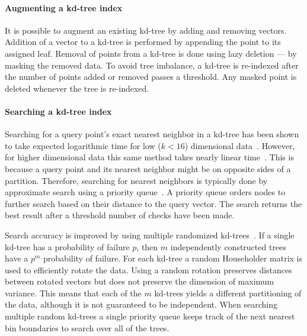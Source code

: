             \paragraph{Augmenting a kd-tree index}
            It is possible to augment an existing kd-tree by adding and removing vectors. Addition of a vector to a
            kd-tree is performed by appending the point to its assigned leaf. Removal of points from a kd-tree is
            done using lazy deletion --- \ie{} by masking the removed data. To avoid tree imbalance, a kd-tree is
            re-indexed after the number of points added or removed passes a threshold. Any masked point is deleted
            whenever the tree is re-indexed.

            \paragraph{Searching a kd-tree index}
            Searching for a query point's exact nearest neighbor in a kd-tree has been shown to take expected
            logarithmic time for low ($k < 16$) dimensional data~\cite{friedman_algorithm_1977}. However, for
            higher dimensional data this same method takes nearly linear time~\cite{sproull_refinements_1991}. This
            is because a query point and its nearest neighbor might be on opposite sides of a partition.
            Therefore, searching for nearest neighbors is typically done by approximate search using a priority
            queue~\cite{beis_shape_1997}.
            A priority queue orders nodes to further search based on their distance to the query vector. 
            The search returns the best result after a threshold number of checks have been made.

            Search accuracy is improved by using multiple randomized kd-trees~\cite{silpa_anan_optimised_2008}. If
            a single kd-tree has a probability of failure $p$, then $m$ independently constructed trees have a
            $p^m$ probability of failure. For each kd-tree a random Householder matrix is used to efficiently
            rotate the data. Using a random rotation preserves distances between rotated vectors but does not
            preserve the dimension of maximum variance. This means that each of the $m$ kd-trees yields a different
            partitioning of the data, although it is not guaranteed to be independent. When searching multiple
            random kd-trees a single priority queue keeps track of the next nearest bin boundaries to search over
            all of the trees.

